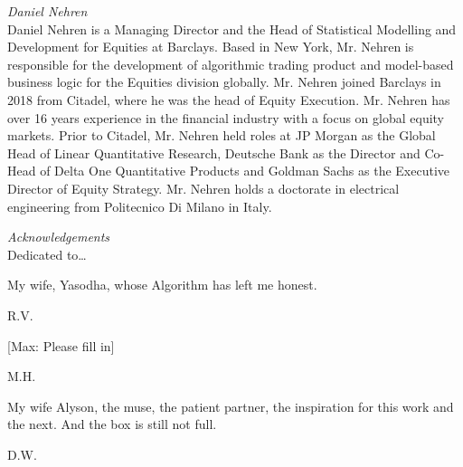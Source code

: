 {\noindent\large\itshape Daniel Nehren} \\[0.2cm]
\noindent Daniel Nehren is a Managing Director and the Head of Statistical Modelling and Development for Equities at Barclays.
Based in New York, Mr. Nehren is responsible for the development of algorithmic trading product and model-based business logic for the Equities division globally. 
Mr. Nehren joined Barclays in 2018 from Citadel, where he was the head of Equity Execution. Mr. Nehren has over 16 years experience in the financial industry with a focus on global equity markets. Prior to Citadel, Mr. Nehren held roles at JP Morgan as the Global Head of Linear Quantitative Research, Deutsche Bank as the Director and Co-Head of Delta One Quantitative Products and Goldman Sachs as the Executive Director of Equity Strategy.
Mr. Nehren holds a doctorate in electrical engineering from Politecnico Di Milano in Italy.



\newpage



{\itshape \large Acknowledgements} \\

Dedicated to\dots \\

\begin{minipage}[t]{0.8\textwidth}
	\raggedright
  	My wife, Yasodha, whose Algorithm has left me honest. \par
  	\raggedleft
  	R.V.
\end{minipage} \vspace{1cm}


\begin{minipage}[t]{0.8\textwidth}
	\raggedright
  	[Max: Please fill in] \par
  	\raggedleft
  	M.H.
\end{minipage} \vspace{1cm}


\begin{minipage}[t]{0.8\textwidth}
	\raggedright
  	My wife Alyson, the muse, the patient partner, the inspiration for this work and the next. And the box is still not full. \par
  	\raggedleft
  	D.W.
\end{minipage} 


















